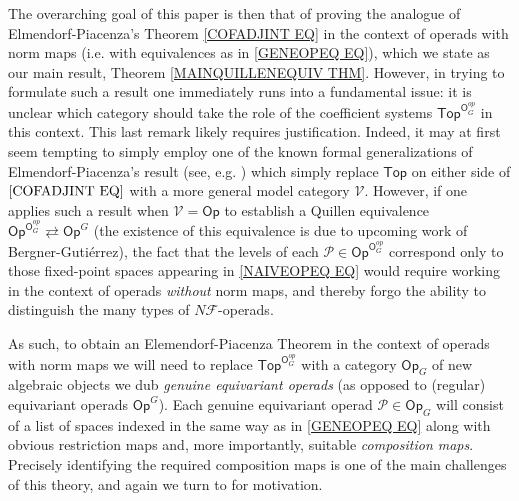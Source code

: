 \documentclass[a4paper,10pt
,draft
]{article}%
\numberwithin{equation}{section}
\numberwithin{figure}{section}
\theoremstyle{definition} %
\newcommand{\Op}{\mathsf{Op}}%
\newcommand{\1}{\ensuremath{\mathbbm 1}}%
\begin{document}
The overarching goal of this paper is then that of proving the analogue of Elmendorf-Piacenza's Theorem \eqref{COFADJINT EQ}
in the context of operads with norm maps (i.e. with equivalences as in \eqref{GENEOPEQ EQ}),
which we state as our main result, Theorem \ref{MAINQUILLENEQUIV THM}.
However, in trying to formulate such a result one immediately runs into a fundamental issue: 
it is unclear which category should take the role of the coefficient systems $\mathsf{Top}^{\mathsf{O}_G^{op}}$ in this context.
This last remark likely requires justification. 
Indeed, it may at first seem tempting to simply 
employ one of the known formal generalizations of Elmendorf-Piacenza's result (see, e.g. \cite[Thm. 3.17]{Ste16}) which simply replace
$\mathsf{Top}$ on either side of $\eqref{COFADJINT EQ}$
with a more general model category $\mathcal{V}$.
However, if one applies such a result when 
$\mathcal{V}=\mathsf{Op}$
to establish a Quillen equivalence
$\mathsf{Op}^{\mathsf{O}_G^{op}}
\rightleftarrows
\mathsf{Op}^G$
(the existence of this equivalence is due to
upcoming work of Bergner-Guti\'{e}rrez), 
the fact that 
the levels of each 
$\mathcal{P} \in \mathsf{Op}^{\mathsf{O}_G^{op}}$
correspond only to those fixed-point spaces appearing in \eqref{NAIVEOPEQ EQ}
would require working in the context of operads \textit{without} norm maps,
and thereby forgo the ability to distinguish 
the many types of $N \mathcal{F}$-operads.

As such, to obtain an Elemendorf-Piacenza Theorem
in the context of operads with norm maps we will need to replace 
$\mathsf{Top}^{\mathsf{O}_G^{op}}$
with a category
$\mathsf{Op}_G$
\index{categories!OpG@$\mathcal P \in \Op_G$}
of new algebraic objects we dub 
\textit{genuine equivariant operads}
(as opposed to (regular) equivariant operads
$\mathsf{Op}^G$).
Each genuine equivariant operad 
$\mathcal{P} \in \mathsf{Op}_G$
will consist of a list of spaces indexed
in the same way as in 
\eqref{GENEOPEQ EQ} along with obvious restriction maps and, more importantly, 
suitable \textit{composition maps}. Precisely identifying the required composition maps is one of the main challenges of this theory, and again we turn to \cite{BH15} for motivation.
\end{document}
